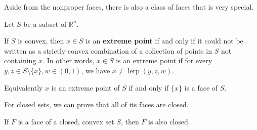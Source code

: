 Aside from the nonproper faces, there is also a class of faces that is very
special.

\begin{definition}
  Let \( S \) be a subset of \( \mathbb{R}^{n} \).

  If \( S \) is convex, then \( x \in S \) is an \textbf{extreme point} if and only if
  it could not be written as a strictly convex combination of a collection
  of points in
  \( S \) not containing \( x \). In other words, \( x \in S \) is an extreme
  point if for every \( y, z \in S \setminus \{x\}, w \in (0, 1)   \), we have
  \( x \neq \operatorname{lerp}(y,z,w) \).

  Equivalently \( x \) is an extreme point of \( S \) if and only if \( \{x\}
  \) is a face of \( S \).
\end{definition}

For closed sets, we can prove that all of its faces are closed.

\begin{theorem}
  If \( F \) is a face of a closed, convex set \( S \), then \( F \) is also
  closed.
\end{theorem}

